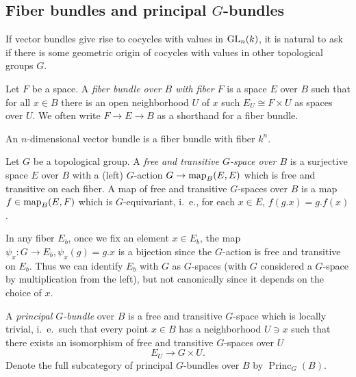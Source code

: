 \documentclass[a4paper,openany]{scrbook}
\DeclareMathOperator{\Princ}{Princ}
\begin{document}
\subsection{\texorpdfstring{Fiber bundles and principal $G$-bundles}{Fiber bundles and principal G-bundles}}

If vector bundles give rise to cocycles with values in $\operatorname{GL}_n(k)$, it is natural to ask if there is some geometric origin of cocycles with values in other topological groups $G$.

\begin{defn}
	Let $F$ be a space. A \emph{fiber bundle over $B$ with fiber $F$} is a space $E$ over $B$ such that for all $x\in B$ there is an open neighborhood $U$ of $x$ such $E_U \cong F \times U$ as spaces over $U$. We often write $F \to E \to B$ as a shorthand for a fiber bundle.
\end{defn}	

\begin{example}
	An $n$-dimensional vector bundle is a fiber bundle with fiber $k^n$.
\end{example}	

\begin{defn}
  Let $G$ be a topological group. A \emph{free and transitive $G$-space over $B$} is a surjective space $E$ over $B$ with a (left) $G$-action $G \to \operatorname{map}_B(E,E)$ which is free and transitive on each fiber. A map of free and transitive $G$-spaces over $B$ is a map $f\in\operatorname{map}_B(E,F)$ which is $G$-equivariant, i.~e., for each $x \in E$, $f  (g.x) = g.f(x)$. 

In any fiber $E_b$, once we fix an element $x \in E_b$, the map $\psi_x\colon G \to E_b, \psi_x(g) = g.x$ is a bijection since the $G$-action is free and transitive on $E_b$. Thus we can identify $E_b$ with $G$ as $G$-spaces (with $G$ considered a $G$-space by multiplication from the left), but not canonically since it depends on the choice of $x$. 

A \emph{principal $G$-bundle} over $B$ is a free and transitive $G$-space which is locally trivial, i.~e.\ such that every point $x \in B$ has a neighborhood $U \ni x$ such that there exists an isomorphism of free and transitive $G$-spaces over $U$
\[
E_U \to G \times U.
\]
Denote the full subcategory of principal $G$-bundles over $B$ by $\Princ_G(B)$.
\end{defn}
\end{document}
